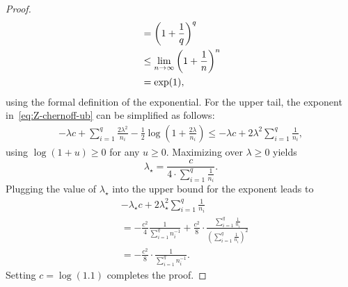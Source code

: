 \begin{proof}
\begin{align}
		                                                           & =
		\left(1 + \frac{1}{q}\right)^q \notag                                   \\
		                                                           & \leq
		\lim_{n \to \infty} \left(1 + \frac{1}{n}\right)^{n} \notag             \\
		                                                           & = \exp(1),
		\label{eq:exp-defn-ub}
	\end{align}
	using the formal definition of the exponential. 
    For the upper tail, the exponent in~\eqref{eq:Z-chernoff-ub} can be simplified as follows:
    \begin{align*}
        -\lambda c + \sum_{i = 1}^q \frac{2 \lambda^2}{n_i} - \frac{1}{2} \log\left(1 + \frac{2 \lambda}{n_i}\right)
        \leq 
        -\lambda c + 2 \lambda^2 \sum_{i = 1}^q \frac{1}{n_i},
    \end{align*}
    using $\log(1 + u) \geq 0$ for any $u \geq 0$.
    Maximizing over $\lambda \geq 0$ yields
    \[
        \lambda_{\star} = \frac{c}{4 \cdot \sum_{i = 1}^q \frac{1}{n_i}}.
    \]
    Plugging the value of $\lambda_{\star}$ into the upper bound for the exponent leads to
    \begin{align*}
        & -\lambda_{\star} c + 2 \lambda_{\star}^2
        \sum_{i = 1}^q \frac{1}{n_i} \\
        &=
        -\frac{c^2}{4} \frac{1}{\sum_{i = 1}^q n_i^{-1}} +
        \frac{c^2}{8} \cdot
        \frac{\sum_{i = 1}^q \frac{1}{n_i}}{
        \left(\sum_{i = 1}^q \frac{1}{n_i}\right)^2
        } \\
        &=
        -\frac{c^2}{8} \cdot \frac{1}{\sum_{i = 1}^q n_i^{-1}}.
    \end{align*}
    Setting $c = \log(1.1)$ completes the proof.
    

\end{proof}
